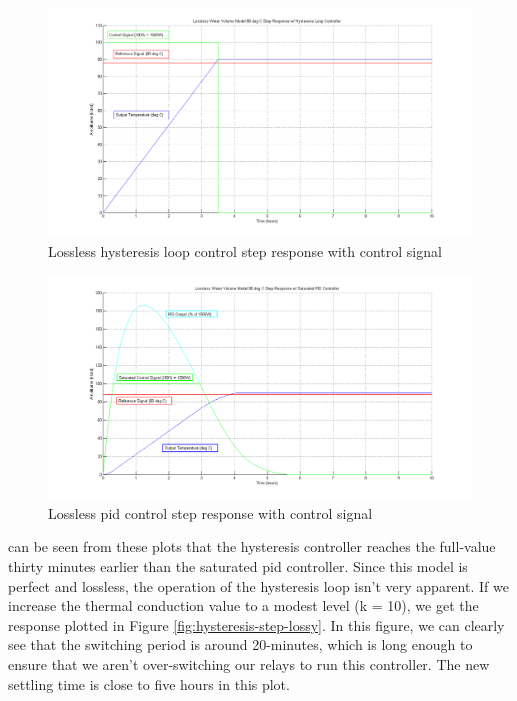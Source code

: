 \documentclass{article}
\begin{document}
\begin{figure}[H]
\begin{center}
\includegraphics[scale=0.30]{hysteresis-step-lossless.png}
\caption{Lossless hysteresis loop control step response with control signal}
\label{fig:hysteresis-step-lossless}
\end{center}
\end{figure}

\begin{figure}[H]
\begin{center}
\includegraphics[scale=0.30]{pid-step-lossless.png}
\caption{Lossless \gls{pid} control step response with control signal}
\label{fig:pid-step-lossless}
\end{center}
\end{figure}

 can be seen from these plots that the hysteresis controller reaches the full-value thirty minutes earlier than the saturated \gls{pid} controller. Since this model is perfect and lossless, the operation of the hysteresis loop isn't very apparent. If we increase the thermal conduction value to a modest level (k = 10), we get the response plotted in Figure \ref{fig:hysteresis-step-lossy}. In this figure, we can clearly see that the switching period is around 20-minutes, which is long enough to ensure that we aren't over-switching our relays to run this controller. The new settling time is close to five hours in this plot.
\end{document}

